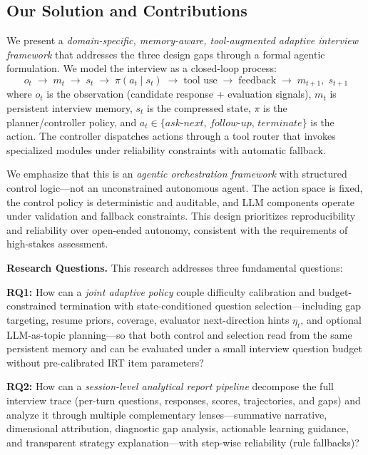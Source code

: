 ﻿\documentclass[final,3p,times,authoryear]{elsarticle}
\begin{document}
\subsection{Our Solution and Contributions}

\noindent We present a \emph{domain-specific, memory-aware, tool-augmented adaptive interview framework} that addresses the three design gaps through a formal agentic formulation. We model the interview as a closed-loop process:
\begin{equation}
o_t \;\rightarrow\; m_t \;\rightarrow\; s_t \;\rightarrow\; \pi(a_t \mid s_t) \;\rightarrow\; \text{tool use} \;\rightarrow\; \text{feedback} \;\rightarrow\; m_{t+1},\; s_{t+1}
\label{eq:agentic_loop}
\end{equation}
where $o_t$ is the observation (candidate response + evaluation signals), $m_t$ is persistent interview memory, $s_t$ is the compressed state, $\pi$ is the planner/controller policy, and $a_t \in \{\textit{ask-next},\, \textit{follow-up},\, \textit{terminate}\}$ is the action. The controller dispatches actions through a tool router that invokes specialized modules under reliability constraints with automatic fallback.

We emphasize that this is an \emph{agentic orchestration framework} with structured control logic---not an unconstrained autonomous agent. The action space is fixed, the control policy is deterministic and auditable, and LLM components operate under validation and fallback constraints. This design prioritizes reproducibility and reliability over open-ended autonomy, consistent with the requirements of high-stakes assessment.

\noindent \textbf{Research Questions.} This research addresses three fundamental questions:

\textbf{RQ1:} How can a \emph{joint adaptive policy} couple difficulty calibration and budget-constrained termination with state-conditioned question selection---including gap targeting, resume priors, coverage, evaluator next-direction hints $\eta_t$, and optional LLM-as-topic planning---so that both control and selection read from the same persistent memory and can be evaluated under a small interview question budget without pre-calibrated IRT item parameters?

\textbf{RQ2:} How can a \emph{session-level analytical report pipeline} decompose the full interview trace (per-turn questions, responses, scores, trajectories, and gaps) and analyze it through multiple complementary lenses---summative narrative, dimensional attribution, diagnostic gap analysis, actionable learning guidance, and transparent strategy explanation---with step-wise reliability (rule fallbacks)?
\end{document}
